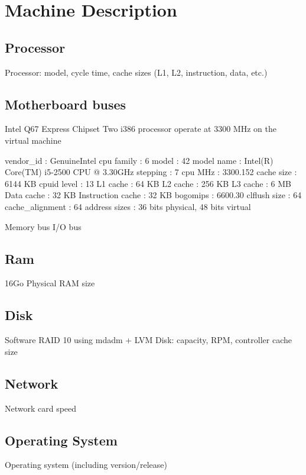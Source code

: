 \section{Machine Description}

\subsection{Processor}

    Processor: model, cycle time, cache sizes (L1, L2, instruction, data, etc.)
\subsection{Motherboard buses}
	Intel Q67 Express Chipset
  	Two i386 processor operate at 3300 MHz on the virtual machine


	vendor_id			: GenuineIntel
	cpu family			: 6
	model				: 42
	model name			: Intel(R) Core(TM) i5-2500 CPU @ 3.30GHz
	stepping			: 7
	cpu MHz			: 3300.152
	cache size			: 6144 KB
	cpuid level		: 13
	L1 cache			: 64 KB
	L2 cache			: 256 KB
	L3 cache			: 6 MB
	Data cache			: 32 KB
	Instruction cache	: 32 KB
	bogomips			: 6600.30
	clflush size		: 64
	cache_alignment		: 64
	address sizes		: 36 bits physical, 48 bits virtual







    Memory bus
    I/O bus

\subsection{Ram}
	16Go Physical
    RAM size

\subsection{Disk}
	Software RAID 10 using mdadm + LVM
    Disk: capacity, RPM, controller cache size

\subsection{Network}
    Network card speed

\subsection{Operating System}
    Operating system (including version/release) 
